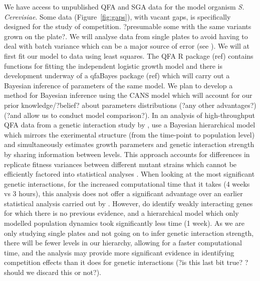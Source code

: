 We have access to unpublished QFA and SGA data for the model organism
\textit{S. Cerevisiae}. Some data (Figure~\ref{fig:gaps}), with vacant
gaps, is specifically designed for the study of
competition. ?presumable some with the same variants grown on the
plate?. We will analyse data from single plates to avoid having to
deal with batch variance which can be a major source of error (see
\citet{Baryshnikova2010}). We will at first fit our model to data
using least squares. The QFA R package (ref) contains functions for
fitting the independent logistic growth model and there is development
underway of a qfaBayes package (ref) which will carry out a Bayesian
inference of parameters of the same model. We plan to develop a method
for Bayesian inference using the CANS model which will account for our
prior knowledge/?belief? about parameters distributions (?any other
advantages?) (?and allow us to conduct model comparison?). In an
analysis of high-throughput QFA data from a genetic interaction study
by \citet{Addinall2011}, \citet{Heydari2016} use a Bayesian
hierarchical model which mirrors the exerimental structure (from the
time-point to population level) and simultaneously estimates growth
parameters and genetic interaction strength by sharing information
between levels. This approach accounts for differences in replicate
fitness variances between different mutant strains which cannot be
efficiently factored into statistical analyses
\citep{Heydari2016}. When looking at the most significant genetic
interactions, for the increased computational time that it takes (4
weeks vs 3 hours), this analysis does not offer a significant
advantage over an earlier statistical analysis carried out by
\citet{Addinall2011}. However, \citet{Heydari2016} do identify weakly
interacting genes for which there is no previous evidence, and a
hierarchical model which only modelled population dynamics took
significantly less time (1 week). As we are only studying single
plates and not going on to infer genetic interaction strength, there
will be fewer levels in our hierarchy, allowing for a faster
computational time, and the analysis may provide more significant
evidence in identifying competition effects than it does for genetic
interactions (?is this last bit true? ?should we discard this or
not?).

